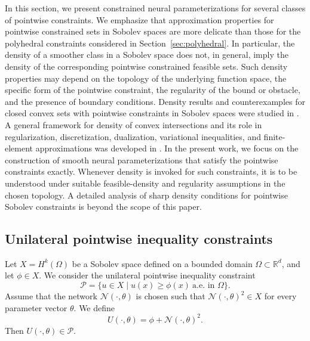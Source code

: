 \documentclass{article}
\numberwithin{equation}{section}
\begin{document}
In this section, we present constrained neural parameterizations for several
classes of pointwise constraints. We emphasize that approximation properties for pointwise constrained sets in Sobolev spaces are more delicate than those for the polyhedral constraints considered in Section~\ref{sec:polyhedral}. In particular, the density of a smoother class in a Sobolev space does not, in general, imply the density of the corresponding pointwise constrained feasible sets. Such density properties may
depend on the topology of the underlying function space, the specific form of
the pointwise constraint, the regularity of the bound or obstacle, and the
presence of boundary conditions. Density results and counterexamples for closed
convex sets with pointwise constraints in Sobolev spaces were studied in
\cite{hintermuller2015density}. A general framework for density of convex
intersections and its role in regularization, discretization, dualization,
variational inequalities, and finite-element approximations was developed in
\cite{hintermuller2017density}. In the present work, we focus on the
construction of smooth neural parameterizations that satisfy the pointwise
constraints exactly. Whenever density is invoked for such constraints, it is to
be understood under suitable feasible-density and regularity assumptions in the
chosen topology. A detailed analysis of sharp density conditions for pointwise
Sobolev constraints is beyond the scope of this paper.

\subsection{Unilateral pointwise inequality constraints}
\label{sec:bound_const}

Let $X=H^k(\Omega)$ be a Sobolev space defined on a bounded domain
$\Omega\subset\mathbb R^d$, and let $\phi\in X$. We consider the unilateral pointwise inequality constraint
\begin{equation}
    \mathcal P
    =
    \{u\in X\mid u(x)\ge \phi(x)\ \text{a.e. in }\Omega\}.
\end{equation}
Assume that the network $\mathcal N(\cdot,\theta)$ is chosen such that
$\mathcal N(\cdot,\theta)^2\in X$ for every parameter vector $\theta$. We define
\begin{equation}
    U(\cdot,\theta)
    =
    \phi+\mathcal N(\cdot,\theta)^2 .
    \label{equa:CNP_lowbound}
\end{equation}
Then $U(\cdot,\theta)\in\mathcal P$. 
\end{document}
